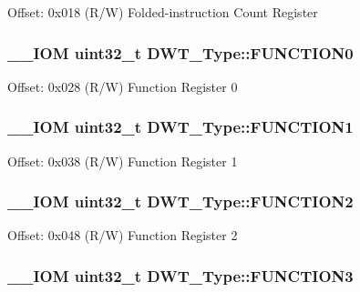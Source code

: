 Offset\-: 0x018 (R/\-W) Folded-\/instruction Count Register \hypertarget{struct_d_w_t___type_a579ae082f58a0317b7ef029b20f52889}{
\subsubsection[{F\-U\-N\-C\-T\-I\-O\-N0}]{\setlength{\rightskip}{0pt plus 5cm}\-\_\-\-\_\-\-I\-O\-M uint32\-\_\-t D\-W\-T\-\_\-\-Type\-::\-F\-U\-N\-C\-T\-I\-O\-N0}}\label{struct_d_w_t___type_a579ae082f58a0317b7ef029b20f52889}
Offset\-: 0x028 (R/\-W) Function Register 0 \hypertarget{struct_d_w_t___type_a8dfcf25675f9606aa305c46e85182e4e}{
\subsubsection[{F\-U\-N\-C\-T\-I\-O\-N1}]{\setlength{\rightskip}{0pt plus 5cm}\-\_\-\-\_\-\-I\-O\-M uint32\-\_\-t D\-W\-T\-\_\-\-Type\-::\-F\-U\-N\-C\-T\-I\-O\-N1}}\label{struct_d_w_t___type_a8dfcf25675f9606aa305c46e85182e4e}
Offset\-: 0x038 (R/\-W) Function Register 1 \hypertarget{struct_d_w_t___type_ab1b60d6600c38abae515bab8e86a188f}{
\subsubsection[{F\-U\-N\-C\-T\-I\-O\-N2}]{\setlength{\rightskip}{0pt plus 5cm}\-\_\-\-\_\-\-I\-O\-M uint32\-\_\-t D\-W\-T\-\_\-\-Type\-::\-F\-U\-N\-C\-T\-I\-O\-N2}}\label{struct_d_w_t___type_ab1b60d6600c38abae515bab8e86a188f}
Offset\-: 0x048 (R/\-W) Function Register 2 \hypertarget{struct_d_w_t___type_a52d4ff278fae6f9216c63b74ce328841}{
\subsubsection[{F\-U\-N\-C\-T\-I\-O\-N3}]{\setlength{\rightskip}{0pt plus 5cm}\-\_\-\-\_\-\-I\-O\-M uint32\-\_\-t D\-W\-T\-\_\-\-Type\-::\-F\-U\-N\-C\-T\-I\-O\-N3}}\label{struct_d_w_t___type_a52d4ff278fae6f9216c63b74ce328841}

